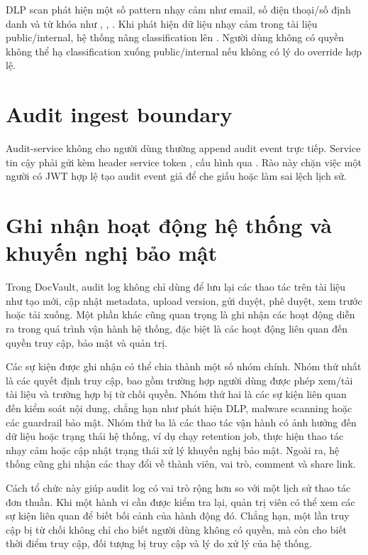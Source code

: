 DLP scan phát hiện một số pattern nhạy cảm như email, số điện thoại/số định danh và từ khóa như , , . Khi phát hiện dữ liệu nhạy cảm trong tài liệu public/internal, hệ thống nâng classification lên . Người dùng không có quyền không thể hạ classification xuống public/internal nếu không có lý do override hợp lệ.

\section{Audit ingest boundary}

Audit-service không cho người dùng thường append audit event trực tiếp. Service tin cậy phải gửi kèm header service token , cấu hình qua . Rào này chặn việc một người có JWT hợp lệ tạo audit event giả để che giấu hoặc làm sai lệch lịch sử.

\section{Ghi nhận hoạt động hệ thống và khuyến nghị bảo mật}

Trong DocVault, audit log không chỉ dùng để lưu lại các thao tác trên tài liệu như tạo mới, cập nhật metadata, upload version, gửi duyệt, phê duyệt, xem trước hoặc tải xuống. Một phần khác cũng quan trọng là ghi nhận các hoạt động diễn ra trong quá trình vận hành hệ thống, đặc biệt là các hoạt động liên quan đến quyền truy cập, bảo mật và quản trị.

Các sự kiện được ghi nhận có thể chia thành một số nhóm chính. Nhóm thứ nhất là các quyết định truy cập, bao gồm trường hợp người dùng được phép xem/tải tài liệu và trường hợp bị từ chối quyền. Nhóm thứ hai là các sự kiện liên quan đến kiểm soát nội dung, chẳng hạn như phát hiện DLP, malware scanning hoặc các guardrail bảo mật. Nhóm thứ ba là các thao tác vận hành có ảnh hưởng đến dữ liệu hoặc trạng thái hệ thống, ví dụ chạy retention job, thực hiện thao tác nhạy cảm hoặc cập nhật trạng thái xử lý khuyến nghị bảo mật. Ngoài ra, hệ thống cũng ghi nhận các thay đổi về thành viên, vai trò, comment và share link.

Cách tổ chức này giúp audit log có vai trò rộng hơn so với một lịch sử thao tác đơn thuần. Khi một hành vi cần được kiểm tra lại, quản trị viên có thể xem các sự kiện liên quan để biết bối cảnh của hành động đó. Chẳng hạn, một lần truy cập bị từ chối không chỉ cho biết người dùng không có quyền, mà còn cho biết thời điểm truy cập, đối tượng bị truy cập và lý do xử lý của hệ thống.

